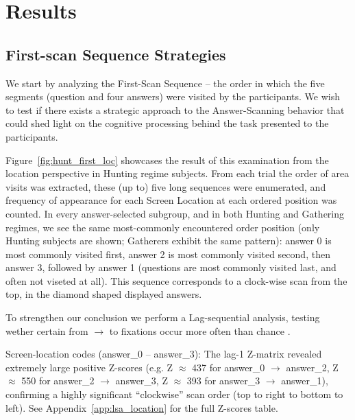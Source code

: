 \documentclass{article}
\begin{document}
\section{Results}
    \subsection{First-scan Sequence Strategies}
    We start by analyzing the First-Scan Sequence -- the order in which the five segments (question and four answers) were visited by the participants. We wish to test if there exists a strategic approach to the Answer-Scanning behavior that could shed light on the cognitive processing behind the task presented to the participants. 

    Figure~\ref{fig:hunt_first_loc} showcases the result of this examination from the location perspective in Hunting regime subjects. From each trial the order of area visits was extracted, these (up to) five long sequences were enumerated, and frequency of appearance for each Screen Location at each ordered position was counted. In every answer-selected subgroup, and in both Hunting and Gathering regimes, we see the same most-commonly encountered order position (only Hunting subjects are shown; Gatherers exhibit the same pattern): answer 0 is most commonly visited first, answer 2 is most commonly visited second, then answer 3, followed by answer 1 (questions are most commonly visited last, and often not viseted at all). This sequence corresponds to a clock-wise scan from the top, in the diamond shaped displayed answers.

    To strengthen our conclusion we perform a Lag-sequential analysis, testing wether certain from $\to$ to fixations occur more often than chance \parencite{bakeman1995log}.

    Screen-location codes (answer\_0 -- answer\_3): The lag-1 Z-matrix revealed extremely large positive Z-scores (e.g. Z  $\approx$ 437 for answer\_0 $\to$ answer\_2, Z $\approx$ 550 for answer\_2 $\to$ answer\_3, Z  $\approx$ 393 for answer\_3 $\to$ answer\_1), confirming a highly significant “clockwise” scan order (top to right to bottom to left). See Appendix~\ref{app:lsa_location} for the full Z-scores table.
\end{document}
